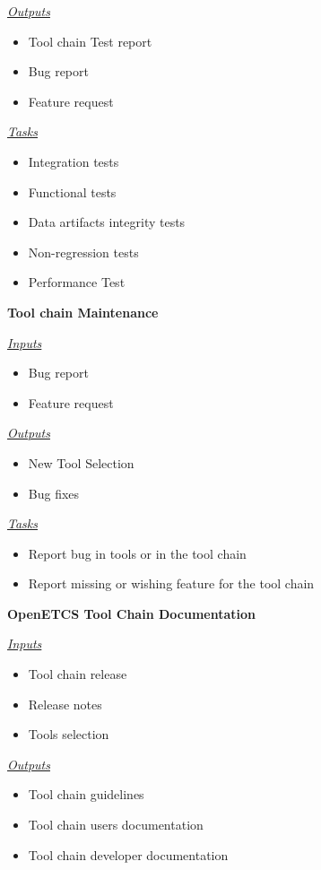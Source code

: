 \documentclass{template/openetcs_article}
\begin{document}
\begin{description}
\underline{\textit{Outputs}}
\begin{itemize}
\item Tool chain Test report
\item Bug report
\item Feature request
\end{itemize}

\underline{\textit{Tasks}}
\begin{itemize}
\item Integration tests
\item Functional tests
\item Data artifacts  integrity tests
\item Non-regression tests
\item Performance Test
\end{itemize}

\item \textbf{Tool chain Maintenance}

\underline{\textit{Inputs}}
\begin{itemize}
\item Bug report
\item Feature request
\end{itemize}


\underline{\textit{Outputs}}
\begin{itemize}
\item New Tool Selection
\item Bug fixes
\end{itemize}

\underline{\textit{Tasks}}
\begin{itemize}
\item Report bug in tools or in the tool chain
\item Report missing or wishing feature for the tool chain
\end{itemize}

\item \textbf{OpenETCS Tool Chain Documentation}

\underline{\textit{Inputs}}
\begin{itemize}
\item Tool chain release
\item Release notes
\item Tools selection
\end{itemize}


\underline{\textit{Outputs}}
\begin{itemize}
\item Tool chain guidelines
\item Tool chain users documentation
\item Tool chain developer documentation
\end{itemize}


\end{description}
\end{document}
